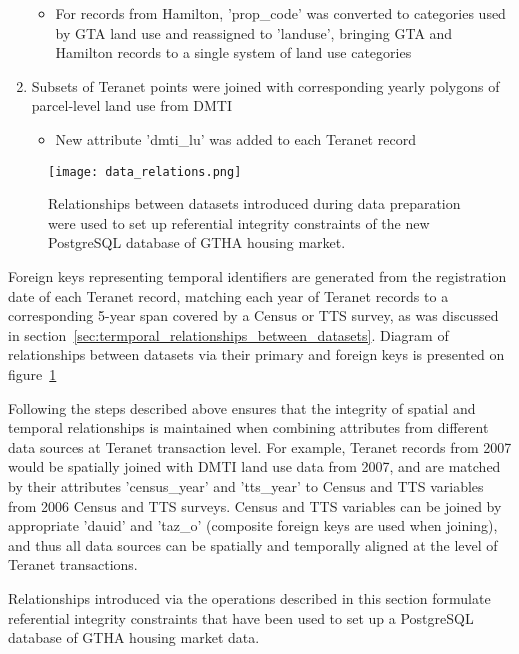 \begin{enumerate}
\begin{itemize}
        \item For records from Hamilton, 'prop\_code' was converted to categories used by GTA land use and reassigned to 'landuse', bringing GTA and Hamilton records to a single system of land use categories
    \end{itemize}
    \item Subsets of Teranet points were joined with corresponding yearly polygons of parcel-level land use from DMTI
    \begin{itemize}
        \item New attribute 'dmti\_lu' was added to each Teranet record
    \end{itemize}
\end{enumerate}

\begin{figure}[hbt!]
    \centering
    \texttt{[image: data\_relations.png]}
    \caption{Relationships between datasets introduced during data preparation were used to set up referential integrity constraints of the new PostgreSQL database of GTHA housing market.}
    \label{fig:data_relations}
\end{figure}

Foreign keys representing temporal identifiers are generated from the registration date of each Teranet record, matching each year of Teranet records to a corresponding 5-year span covered by a Census or TTS survey, as was discussed in section~\ref{sec:termporal_relationships_between_datasets}.
Diagram of relationships between datasets via their primary and foreign keys is presented on figure~\ref{fig:data_relations}

Following the steps described above ensures that the integrity of spatial and temporal relationships is maintained when combining attributes from different data sources at Teranet transaction level.
For example, Teranet records from 2007 would be spatially joined with DMTI land use data from 2007, and are matched by their attributes 'census\_year' and 'tts\_year' to Census and TTS variables from 2006 Census and TTS surveys.
Census and TTS variables can be joined by appropriate 'dauid' and 'taz\_o' (composite foreign keys are used when joining), and thus all data sources can be spatially and temporally aligned at the level of Teranet transactions.

Relationships introduced via the operations described in this section formulate referential integrity constraints that have been used to set up a PostgreSQL database of GTHA housing market data.

